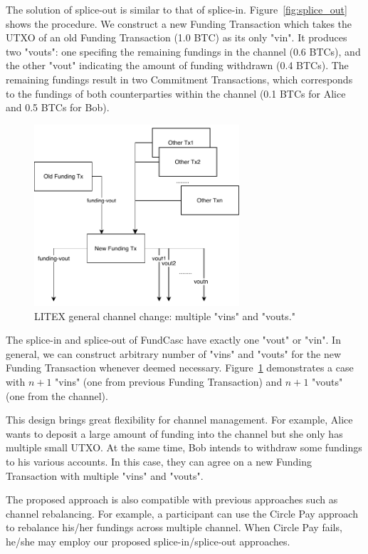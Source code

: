 The solution of splice-out is similar to that of splice-in. Figure~\ref{fig:splice_out} shows the procedure. We construct a new Funding Transaction which takes the UTXO of an old Funding Transaction (1.0 BTC) as its only "vin". It produces two "vouts": one specifing the remaining fundings in the channel (0.6 BTCs), and the
other "vout" indicating the amount of funding withdrawn (0.4 BTCs). The remaining
fundings result in two Commitment Transactions, which corresponds to the fundings of both counterparties within the channel (0.1 BTCs for Alice and 0.5 BTCs for Bob).

\begin{figure}[H]
\centering
\includegraphics[width=3in]{figs/channel_change.pdf}
\vspace{-6pt}
\caption{LITEX general channel change: multiple "vins" and "vouts."}
\label{fig:change}
\end{figure}

The splice-in and splice-out of FundCasc have exactly one "vout" or "vin". In general, we can construct arbitrary number of "vins" and "vouts" for the new Funding Transaction whenever deemed necessary. Figure~\ref{fig:change} demonstrates a case with $n+1$ "vins" (one from previous Funding Transaction) and $n+1$ "vouts" (one from the channel).


This design brings great flexibility for channel management. For example,
Alice wants to deposit a large amount of funding into the channel but she only
has multiple small UTXO. At the same time, Bob intends to withdraw some fundings
to his various accounts. In this case, they can agree on a new Funding Transaction with multiple "vins" and "vouts".


The proposed approach is also compatible with previous approaches such as
channel rebalancing. For example, a participant can use the Circle Pay approach
to rebalance his/her fundings across multiple channel. When Circle Pay fails,
he/she may employ our proposed splice-in/splice-out approaches.
